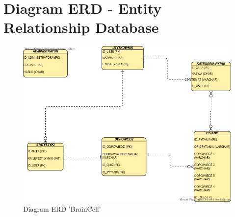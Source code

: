 	\newpage
\section{Diagram ERD - Entity Relationship Database}		%

\begin{figure}[!htb]
	\begin{center}
		\includegraphics[width=15cm]{rys/diagram erd.png}
		\caption{Diagram ERD 'BrainCell'}
		\label{rys:rysunek002}
	\end{center}
\end{figure} 



